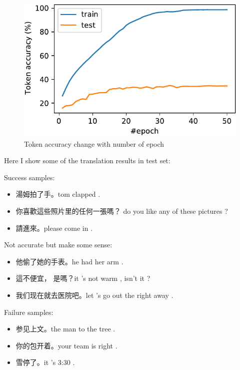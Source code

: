 \documentclass[journal, a4paper]{IEEEtran}
\begin{document}
\begin{figure}
    \includegraphics[width=\linewidth]{figures/acc.pdf}
    \caption{Token accuracy change with number of epoch}
    \label{figure:acc}
\end{figure}

Here I show some of the translation results in test set:

Success samples:

\begin{itemize}
    \item 湯姆拍了手。\newline tom clapped .
    \item 你喜歡這些照片里的任何一張嗎？\newline
    do you like any of these pictures ?
    \item 請進來。\newline please come in .
\end{itemize}

Not accurate but make some sense:

\begin{itemize}
    \item 他偷了她的手表。\newline he had her arm .
    \item 這不便宜， 是嗎？\newline it 's not warm , isn't it ?
    \item 我们现在就去医院吧。\newline let 's go out the right away .
\end{itemize}

Failure samples:

\begin{itemize}
    \item 参见上文。\newline the man to the tree .
    \item 你的包开着。\newline your team is right .
    \item 雪停了。\newline it 's 3:30 .
\end{itemize}
\end{document}

